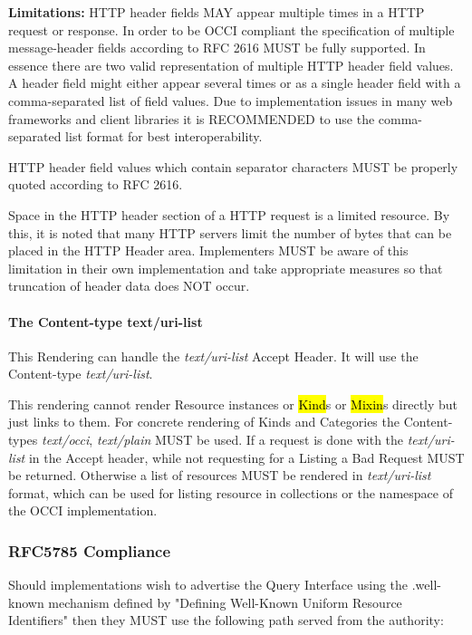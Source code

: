 \documentclass[10pt,a4paper]{article}
\begin{document}
\textbf{Limitations: } HTTP header fields MAY appear multiple times in
a HTTP request or response. In order to be OCCI compliant the
specification of multiple message-header fields according to RFC 2616
MUST be fully supported. In essence there are two valid representation
of multiple HTTP header field values. A header field might either
appear several times or as a single header field with a
comma-separated list of field values. Due to implementation issues in
many web frameworks and client libraries it is RECOMMENDED to use the
comma-separated list format for best interoperability.

HTTP header field values which contain separator characters MUST be
properly quoted according to RFC 2616.

Space in the HTTP header section of a HTTP request is a limited
resource. By this, it is noted that many HTTP servers limit the number
of bytes that can be placed in the HTTP Header area. Implementers MUST
be aware of this limitation in their own implementation and take
appropriate measures so that truncation of header data does NOT occur.

\paragraph{The Content-type text/uri-list}
This Rendering can handle the \textit{text/uri-list} Accept Header. It
will use the Content-type \textit{text/uri-list}.

This rendering cannot render Resource instances or \hl{Kind}s or
\hl{Mixin}s directly but just links to them. For concrete rendering of
Kinds and Categories the Content-types \textit{text/occi},
\textit{text/plain} MUST be used. If a request is done with the
\textit{text/uri-list} in the Accept header, while not requesting for
a Listing a Bad Request MUST be returned. Otherwise a list of
resources MUST be rendered in \emph{text/uri-list} format, which can
be used for listing resource in collections or the namespace of the
OCCI implementation.

\subsubsection{RFC5785 Compliance}
\label{sec:rfc5785_compliance}
Should implementations wish to advertise the Query Interface using the
.well-known mechanism defined by "Defining Well-Known Uniform Resource
Identifiers" \cite{rfc5785} then they MUST use the following path
served from the authority:
\end{document}
